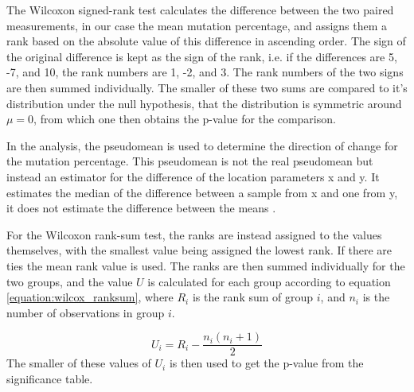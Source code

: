 The Wilcoxon signed-rank test calculates the difference between the two paired measurements, in our case the mean mutation percentage, and assigns them a rank based on the absolute value of this difference in ascending order.
The sign of the original difference is kept as the sign of the rank, i.e. if the differences are 5, -7, and 10, the rank numbers are 1, -2, and 3. 
The rank numbers of the two signs are then summed individually. The smaller of these two sums are compared to it's distribution under the null hypothesis, that the distribution is symmetric around $\mu = 0$, from which one then obtains the p-value for the comparison\cite{wilcoxon1945IndividualComparisonsRanking}.

In the analysis, the pseudomean is used to determine the direction of change for the mutation percentage. This pseudomean is not the real pseudomean but instead an estimator for the difference of the location parameters x and y. It estimates the median of the difference between a sample from x and one from y, it does not estimate the difference between the means \cite{thercoreteamWilcoxtestWilcoxonRank}.


For the Wilcoxon rank-sum test, the ranks are instead assigned to the values themselves, with the smallest value being assigned the lowest rank. If there are ties the mean rank value is used. The ranks are then summed individually for the two groups, and the value $U$ is calculated for each group according to equation \eqref{equation:wilcox_ranksum}, where $R_i$ is the rank sum of group $i$, and $n_i$ is the number of observations in group $i$.

\begin{equation}
    \label{equation:wilcox_ranksum}
    U_i = R_i - \frac{n_i \left( n_i + 1 \right)}{2}
\end{equation}
The smaller of these values of $U_i$ is then used to get the p-value from the significance table. 

